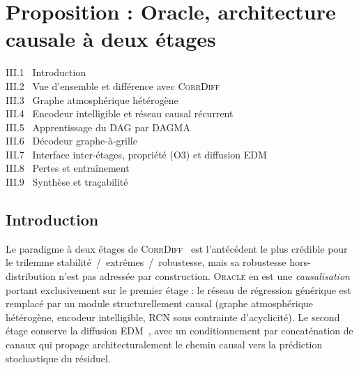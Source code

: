 \documentclass[14pt,a4paper,openany]{extreport}
\theoremstyle{definition}
\newcommand{\Oracle}{\textsc{Oracle}}
\newcommand{\CorrDiff}{\textsc{CorrDiff}}
\begin{document}
\chapter{Proposition : Oracle, architecture causale à deux étages}
\label{chap:oracle}

\begin{sommairebox}
\small
\noindent III.1 \ Introduction \dotfill \pageref{sec:oracle-intro}\\
\noindent III.2 \ Vue d'ensemble et différence avec \CorrDiff{} \dotfill \pageref{sec:oracle-overview}\\
\noindent III.3 \ Graphe atmosphérique hétérogène \dotfill \pageref{sec:oracle-graphe}\\
\noindent III.4 \ Encodeur intelligible et réseau causal récurrent \dotfill \pageref{sec:oracle-encoder}\\
\noindent III.5 \ Apprentissage du DAG par DAGMA \dotfill \pageref{sec:oracle-dagma}\\
\noindent III.6 \ Décodeur graphe-à-grille \dotfill \pageref{sec:oracle-decoder}\\
\noindent III.7 \ Interface inter-étages, propriété (O3) et diffusion EDM \dotfill \pageref{sec:oracle-o3}\\
\noindent III.8 \ Pertes et entraînement \dotfill \pageref{sec:oracle-pertes}\\
\noindent III.9 \ Synthèse et traçabilité \dotfill \pageref{sec:oracle-synthese}
\end{sommairebox}

\vspace{0.5em}

\section{Introduction}
\label{sec:oracle-intro}

Le paradigme à deux étages de \CorrDiff{}~\cite{mardani_corrdiff_2023} est l'antécédent le plus crédible pour le trilemme stabilité~/~extrêmes~/~robustesse, mais sa robustesse hors-distribution n'est pas adressée par construction. \Oracle{} en est une \emph{causalisation} portant exclusivement sur le premier étage : le réseau de régression générique est remplacé par un module structurellement causal (graphe atmosphérique hétérogène, encodeur intelligible, RCN sous contrainte d'acyclicité). Le second étage conserve la diffusion EDM~\cite{karras_edm_2022}, avec un conditionnement par concaténation de canaux qui propage architecturalement le chemin causal vers la prédiction stochastique du résiduel.
\end{document}
